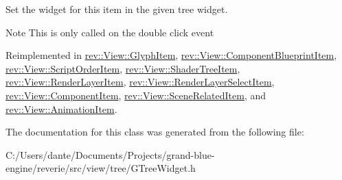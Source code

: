 Set the widget for this item in the given tree widget. 

\begin{DoxyNote}{Note}
This is only called on the double click event 
\end{DoxyNote}


Reimplemented in \mbox{\hyperlink{classrev_1_1_view_1_1_glyph_item_a0afc24f14c725056ad457f43881ea279}{rev\+::\+View\+::\+Glyph\+Item}}, \mbox{\hyperlink{classrev_1_1_view_1_1_component_blueprint_item_a4e95fe4df8420803062b1d778ffb0649}{rev\+::\+View\+::\+Component\+Blueprint\+Item}}, \mbox{\hyperlink{classrev_1_1_view_1_1_script_order_item_a1bdbd86e1f9e909818b5389266151024}{rev\+::\+View\+::\+Script\+Order\+Item}}, \mbox{\hyperlink{classrev_1_1_view_1_1_shader_tree_item_af7456acaae6ab27a4c215a1ee9cdf930}{rev\+::\+View\+::\+Shader\+Tree\+Item}}, \mbox{\hyperlink{classrev_1_1_view_1_1_render_layer_item_a47da9e3b2ab654727f724a951b061acf}{rev\+::\+View\+::\+Render\+Layer\+Item}}, \mbox{\hyperlink{classrev_1_1_view_1_1_render_layer_select_item_aa2dd6d026ec2c87552cb56d678e6975c}{rev\+::\+View\+::\+Render\+Layer\+Select\+Item}}, \mbox{\hyperlink{classrev_1_1_view_1_1_component_item_a0f694632880dffcee4c0225e9e022bb9}{rev\+::\+View\+::\+Component\+Item}}, \mbox{\hyperlink{classrev_1_1_view_1_1_scene_related_item_a95e05efcaa12dd3deb2cabd7c3bdd343}{rev\+::\+View\+::\+Scene\+Related\+Item}}, and \mbox{\hyperlink{classrev_1_1_view_1_1_animation_item_a20494b0ab95631fb2e2aec918952f0f4}{rev\+::\+View\+::\+Animation\+Item}}.



The documentation for this class was generated from the following file\+:\begin{DoxyCompactItemize}
\item 
C\+:/\+Users/dante/\+Documents/\+Projects/grand-\/blue-\/engine/reverie/src/view/tree/G\+Tree\+Widget.\+h\end{DoxyCompactItemize}

